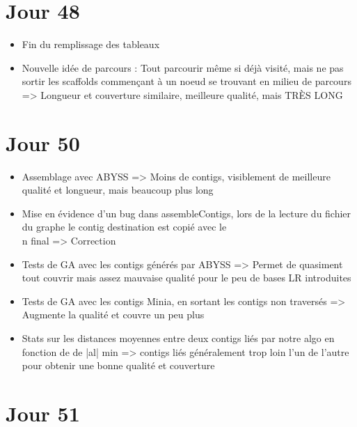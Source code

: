 \documentclass[12pt]{report}
\begin{document}
\section{Jour 48}

\begin{itemize}
	\item Fin du remplissage des tableaux

	\item Nouvelle idée de parcours : Tout parcourir même si déjà visité, mais ne pas sortir les scaffolds commençant à un noeud
	se trouvant en milieu de parcours => Longueur et couverture similaire, meilleure qualité, mais TRÈS LONG
\end{itemize}

\section{Jour 50}

\begin{itemize}
	\item Assemblage avec ABYSS => Moins de contigs, visiblement de meilleure qualité et longueur, mais beaucoup plus long
	
	\item Mise en évidence d'un bug dans assembleContigs, lors de la lecture du fichier du graphe le contig destination est copié avec le \\n final => 
	Correction
	
	\item Tests de GA avec les contigs générés par ABYSS => Permet de quasiment tout couvrir mais assez mauvaise qualité pour le peu de bases LR introduites
	
	\item Tests de GA avec les contigs Minia, en sortant les contigs non traversés => Augmente la qualité et couvre un peu plus
	
	\item Stats sur les distances moyennes entre deux contigs liés par notre algo en fonction de de |al| min
		  => contigs liés généralement trop loin l'un de l'autre pour obtenir une bonne qualité et couverture
\end{itemize}

\section{Jour 51}
\end{document}
